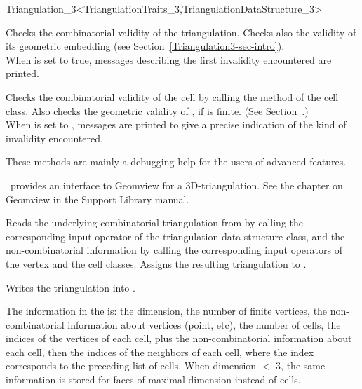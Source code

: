 \begin{ccRefClass}{Triangulation_3<TriangulationTraits_3,TriangulationDataStructure_3>}
\begin{ccAdvanced}
{Checks the combinatorial validity of the triangulation. Checks also the
validity of its geometric embedding (see
Section~\ref{Triangulation3-sec-intro}).\\ When  is set to true, 
messages describing the first invalidity encountered are printed.}

{Checks the combinatorial validity of the cell by calling the
 method of the  cell class. Also checks the
geometric validity of , if  is finite. (See
Section~\pageref{Triangulation3-sec-intro}.)\\ 
When  is set to , messages are printed to give
a precise indication of the kind of invalidity encountered.}

These methods are mainly a debugging help for the users of advanced features.

\end{ccAdvanced}


\cgal\ provides an interface to Geomview for a 3D-triangulation. 
See the chapter on Geomview in the Support Library manual.

{Reads the underlying combinatorial triangulation from  by
calling the corresponding input operator of the triangulation data
structure class, and the non-combinatorial information by calling the
corresponding input operators of the vertex and the cell
classes. Assigns the resulting triangulation to .}

{Writes the triangulation  into .}

The information in the  is: the dimension, the number of
finite vertices, the non-combinatorial information about vertices (point,
etc), the number of cells, the indices of the vertices of each cell,
plus the non-combinatorial information about each cell, 
then the indices of the neighbors of each cell, where the index
corresponds to the preceding list of cells. When dimension $<$ 3, the
same information is stored for faces of maximal dimension instead of
cells. 

\ccSeeAlso

\\


\end{ccRefClass}

